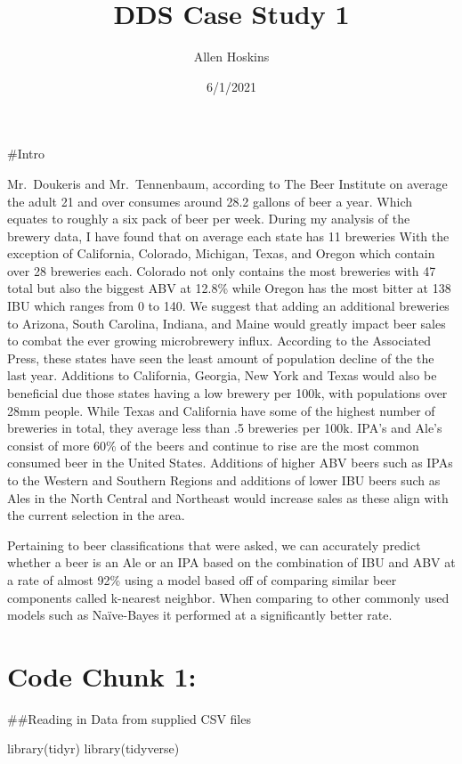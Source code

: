 \documentclass[
]{article}
\title{DDS Case Study 1}
\author{Allen Hoskins}
\date{6/1/2021}
\newenvironment{Shaded}{\begin{snugshade}}{\end{snugshade}}
\newcommand{\FunctionTok}[1]{\textcolor[rgb]{0.00,0.00,0.00}{#1}}
\newcommand{\NormalTok}[1]{#1}
\begin{document}
\maketitle

\#Intro

Mr.~Doukeris and Mr.~Tennenbaum, according to The Beer Institute on
average the adult 21 and over consumes around 28.2 gallons of beer a
year. Which equates to roughly a six pack of beer per week. During my
analysis of the brewery data, I have found that on average each state
has 11 breweries With the exception of California, Colorado, Michigan,
Texas, and Oregon which contain over 28 breweries each. Colorado not
only contains the most breweries with 47 total but also the biggest ABV
at 12.8\% while Oregon has the most bitter at 138 IBU which ranges from
0 to 140. We suggest that adding an additional breweries to Arizona,
South Carolina, Indiana, and Maine would greatly impact beer sales to
combat the ever growing microbrewery influx. According to the Associated
Press, these states have seen the least amount of population decline of
the the last year. Additions to California, Georgia, New York and Texas
would also be beneficial due those states having a low brewery per 100k,
with populations over 28mm people. While Texas and California have some
of the highest number of breweries in total, they average less than .5
breweries per 100k. IPA's and Ale's consist of more 60\% of the beers
and continue to rise are the most common consumed beer in the United
States. Additions of higher ABV beers such as IPAs to the Western and
Southern Regions and additions of lower IBU beers such as Ales in the
North Central and Northeast would increase sales as these align with the
current selection in the area.

Pertaining to beer classifications that were asked, we can accurately
predict whether a beer is an Ale or an IPA based on the combination of
IBU and ABV at a rate of almost 92\% using a model based off of
comparing similar beer components called k-nearest neighbor. When
comparing to other commonly used models such as Naïve-Bayes it performed
at a significantly better rate.

\hypertarget{code-chunk-1}{%
\section{Code Chunk 1:}\label{code-chunk-1}}

\#\#Reading in Data from supplied CSV files

\begin{Shaded}
\begin{Highlighting}[]
\FunctionTok{library}\NormalTok{(tidyr)}
\FunctionTok{library}\NormalTok{(tidyverse)}
\end{Highlighting}
\end{Shaded}
\end{document}
